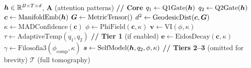 \begin{algorithm}[H]
\caption{EpistemicHead Forward}
\label{alg:epistemic_forward}
\begin{algorithmic}[1]
\REQUIRE $\bm{h} \in \mathbb{R}^{B \times T \times d}$, $\bm{A}$ (attention patterns)
\STATE \textbf{// Core}
\STATE $q_1 \leftarrow \text{Q1Gate}(\bm{h})$
\STATE $q_2 \leftarrow \text{Q2Gate}(\bm{h})$
\STATE $\bm{c} \leftarrow \text{ManifoldEmb}(\bm{h})$ 
\STATE $\bm{G} \leftarrow \text{MetricTensor}()$ 
\STATE $d^2 \leftarrow \text{GeodesicDist}(\bm{c}, \bm{G})$ 
\STATE $\kappa \leftarrow \text{MADConfidence}(\bm{c})$ 
\STATE $\phi \leftarrow \text{PhiField}(\bm{c}, \kappa)$ 
\STATE $\bm{v} \leftarrow \text{VI}(\phi, \kappa)$ 
\STATE $\tau \leftarrow \text{AdaptiveTemp}(q_1, q_2)$ 
\STATE \textbf{// Tier 1} (if enabled)
\STATE $\bm{e} \leftarrow \text{EidosDecay}(\bm{c}, \kappa)$
\STATE $\gamma \leftarrow \text{Filosofia3}(\phi_{\text{comp}}, \kappa)$
\STATE $\bm{s} \leftarrow \text{SelfModel}(\bm{h}, q_2, \phi, \kappa)$
\STATE \textbf{// Tiers 2--3} (omitted for brevity)
\RETURN $\mathcal{T}$ (full tomography)
\end{algorithmic}
\end{algorithm}
